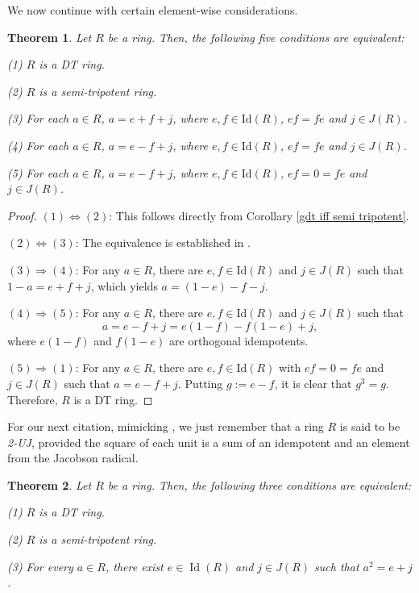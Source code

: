 \documentclass[12pt]{amsart}
\newtheorem{theorem}{Theorem}[section]
\theoremstyle{definition}
\begin{document}
We now continue with certain element-wise considerations.

\begin{theorem}\label{avali T GDT}
Let $R$ be a ring. Then, the following five conditions are equivalent:

(1) $R$ is a DT ring.

(2) $R$ is a semi-tripotent ring.

(3) For each $a \in R$, $a = e+f+j$, where $e,f \in \text{Id}(R)$, $ef=fe$ and $j \in J(R)$.

(4) For each $a \in R$, $a = e-f+j$, where $e,f \in \text{Id}(R)$, $ef=fe$ and $j \in J(R)$.

(5) For each $a \in R$, $a = e-f+j$, where $e,f \in \text{Id}(R)$, $ef=0=fe$ and $j \in J(R)$.
\end{theorem}

\begin{proof}
$(1) \Leftrightarrow (2)$: This follows directly from Corollary \ref{gdt iff semi tripotent}.

$(2) \Leftrightarrow (3)$: The equivalence is established in \cite[Theorem 3.7]{kyzr}.

$(3) \Rightarrow (4)$: For any $a \in R$, there are $e,f \in \text{Id}(R)$ and $j \in J(R)$ such that $1-a = e+f+j$, which yields $a = (1-e)-f-j$.

$(4) \Rightarrow (5)$: For any $a \in R$, there are $e,f \in \text{Id}(R)$ and $j \in J(R)$ such that $$a = e-f+j = e(1-f)-f(1-e)+j,$$ where $e(1-f)$ and $f(1-e)$ are orthogonal idempotents.

$(5) \Rightarrow (1)$: For any $a \in R$, there are $e,f \in \text{Id}(R)$ with $ef=0=fe$ and $j \in J(R)$ such that $a = e-f+j$. Putting $g:=e-f$, it is clear that $g^3=g$. Therefore, $R$ is a DT ring.
\end{proof}

For our next citation, mimicking \cite{cui}, we just remember that a ring $R$ is said to be {\it 2-UJ}, provided the square of each unit is a sum of an idempotent and an element from the Jacobson radical.

\begin{theorem}\label{maj3}
Let $R$ be a ring. Then, the following three conditions are equivalent:

(1) $R$ is a DT ring.

(2) $R$ is a semi-tripotent ring.

(3) For every $a \in R$, there exist $e \in \operatorname{Id}(R)$ and $j \in J(R)$ such that $a^2 = e + j$.
\end{theorem}
\end{document}

